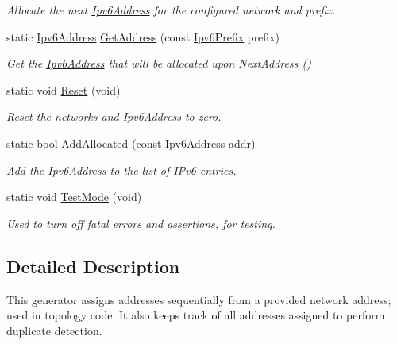 \begin{DoxyCompactItemize}
\begin{DoxyCompactList}\small\item\em Allocate the next \hyperlink{classns3_1_1Ipv6Address}{Ipv6\+Address} for the configured network and prefix. \end{DoxyCompactList}\item 
static \hyperlink{classns3_1_1Ipv6Address}{Ipv6\+Address} \hyperlink{classns3_1_1Ipv6AddressGenerator_aa28e6390d3289b82b2b3310d9de2015a}{Get\+Address} (const \hyperlink{classns3_1_1Ipv6Prefix}{Ipv6\+Prefix} prefix)
\begin{DoxyCompactList}\small\item\em Get the \hyperlink{classns3_1_1Ipv6Address}{Ipv6\+Address} that will be allocated upon Next\+Address () \end{DoxyCompactList}\item 
static void \hyperlink{classns3_1_1Ipv6AddressGenerator_a98078c6611180e79d548c2371d8dd57b}{Reset} (void)
\begin{DoxyCompactList}\small\item\em Reset the networks and \hyperlink{classns3_1_1Ipv6Address}{Ipv6\+Address} to zero. \end{DoxyCompactList}\item 
static bool \hyperlink{classns3_1_1Ipv6AddressGenerator_a906de97d82d4e6898eb8d019bc81077f}{Add\+Allocated} (const \hyperlink{classns3_1_1Ipv6Address}{Ipv6\+Address} addr)
\begin{DoxyCompactList}\small\item\em Add the \hyperlink{classns3_1_1Ipv6Address}{Ipv6\+Address} to the list of I\+Pv6 entries. \end{DoxyCompactList}\item 
static void \hyperlink{classns3_1_1Ipv6AddressGenerator_a89aa5af34b1e75c15449855032b10e48}{Test\+Mode} (void)
\begin{DoxyCompactList}\small\item\em Used to turn off fatal errors and assertions, for testing. \end{DoxyCompactList}\end{DoxyCompactItemize}


\subsection{Detailed Description}
This generator assigns addresses sequentially from a provided network address; used in topology code. It also keeps track of all addresses assigned to perform duplicate detection. 

